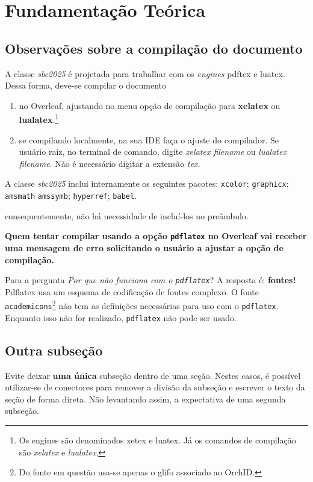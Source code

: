 \section{Fundamentação Teórica}
\label{sec:fundamentacao}


\subsection{Observações sobre a compilação do documento}

A classe \textsl{sbc2025} é projetada para trabalhar com os \textit{engines} pdftex e luatex. Dessa forma, deve-se compilar o documento 
\begin{enumerate}
    \item no Overleaf, ajustando no menu opção de compilação para \textbf{xelatex} ou \textbf{lualatex}.\footnote{Os engines são denominados xetex e luatex. Já os comandos de compilação são \textsl{xelatex} e \textsl{lualatex}.}
    \item se compilando localmente, na sua IDE faça o ajuste do compilador. Se usuário raiz, no terminal de comando, digite \textsl{xelatex filename} ou \textsl{lualatex filename}. Não é necessário digitar a extensão \textsl{tex}.
\end{enumerate}

A classe \textsl{sbc2025} inclui internamente os seguintes pacotes:     \texttt{xcolor}; \texttt{graphicx}; \texttt{amsmath} \texttt{amssymb}; \texttt{hyperref};     \texttt{babel}.

\noindent consequentemente, não há necessidade de incluí-los no preâmbulo.

{\bfseries Quem tentar compilar usando a opção \texttt{pdflatex} no Overleaf vai receber uma mensagem de erro solicitando o usuário a ajustar a opção de compilação.}

Para a pergunta \textit{Por que não funciona com o \texttt{pdflatex}}?  A resposta é: \textbf{fontes!} Pdflatex usa um esquema de codificação de fontes complexo. 
O fonte \texttt{academicons}\footnote{Do fonte em questão usa-se apenas o glifo associado ao OrchID.} não tem as definições necessárias para uso com o \texttt{pdflatex}. Enquanto isso não for realizado, \texttt{pdflatex} não pode ser usado. 



\subsection{Outra subseção}

Evite deixar \textbf{uma única} subseção dentro de uma seção. Nestes casos, é possível utilizar-se de conectores para remover a divisão da subseção e escrever o texto da seção de forma direta. Não levantando assim, a expectativa de uma segunda subseção.
